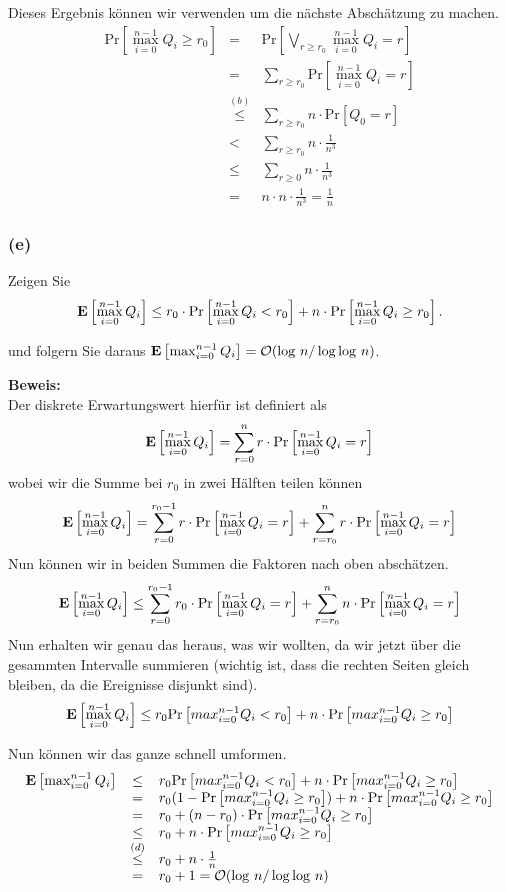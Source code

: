 \documentclass[11pt,a4paper,ngerman]{article}
\newcommand{\erw}[1]{\text{\bfseries E} \left[ #1 \right]}
\newcommand{\prob}[1]{\text{Pr}\left[ #1 \right]}
\begin{document}
Dieses Ergebnis können wir verwenden um die nächste Abschätzung zu machen.
$$\begin{array}{rcl}
	\prob{\max_{i=0}^{n-1} Q_i \geq r_0} &=& \prob{\underset{r \geq r_0}{\bigvee} \max_{i=0}^{n-1} Q_i = r}\\
		&=& \underset{r\geq r_0}{\sum} \prob{\max_{i=0}^{n-1} Q_i = r}\\
		&\stackrel{(b)}{\leq}& \underset{r\geq r_0}{\sum} n \cdot \prob{Q_0 = r}\\
		&<& \underset{r \geq r_0}{\sum} n \cdot \frac{1}{n^3}\\
		&\leq& \underset{r \geq 0}{\sum} n \cdot \frac{1}{n^3}\\
		&=& n \cdot n \cdot \frac{1}{n^3} = \frac{1}{n}
\end{array}$$

\subsubsection*{(e)}
Zeigen Sie
$$
	\erw{\max_{i=0}^{n-1} Q_i} \leq r_0 \cdot \prob{\max_{i=0}^{n-1} Q_i < r_0} + n \cdot \prob{\max_{i=0}^{n-1} Q_i \geq r_0}.
$$

und folgern Sie daraus $\erw{\max_{i=0}^{n-1}Q_i} = \mathcal{O}(\log \, n / \log \log \, n)$.

\noindent\textbf{Beweis:}\\

Der diskrete Erwartungswert hierfür ist definiert als
$$
	\erw{\max_{i=0}^{n-1} Q_i} = \sum_{r=0}^n r \cdot \prob{\max_{i=0}^{n-1} Q_i = r}
$$
wobei wir die Summe bei $r_0$ in zwei Hälften teilen können
$$
	\erw{\max_{i=0}^{n-1} Q_i} = \sum_{r=0}^{r_0-1}r \cdot \prob{\max_{i=0}^{n-1} Q_i = r} + \sum_{r= r_0}^n  r \cdot \prob{\max_{i=0}^{n-1} Q_i = r}
$$
Nun können wir in beiden Summen die Faktoren nach oben abschätzen.
$$
	\erw{\max_{i=0}^{n-1} Q_i} \leq \sum_{r=0}^{r_0-1}r_0 \cdot \prob{\max_{i=0}^{n-1} Q_i = r} + \sum_{r= r_0}^n  n \cdot \prob{\max_{i=0}^{n-1} Q_i = r}
$$
Nun erhalten wir genau das heraus, was wir wollten, da wir jetzt über die gesammten Intervalle summieren (wichtig ist,
dass die rechten Seiten gleich bleiben, da die Ereignisse disjunkt sind).
$$
	\erw{\max_{i=0}^{n-1}Q_i} \leq r_0 \prob{max_{i=0}^{n-1} Q_i < r_0} + n \cdot \prob{max_{i=0}^{n-1} Q_i \geq r_0}
$$

Nun können wir das ganze schnell umformen.
$$\begin{array}{rcl}
	\erw{\max_{i=0}^{n-1}Q_i} &\leq&  r_0 \prob{max_{i=0}^{n-1} Q_i < r_0} + n \cdot \prob{max_{i=0}^{n-1} Q_i \geq r_0}\\
		&=& r_0 (1 - \prob{max_{i=0}^{n-1} Q_i \geq r_0}) + n \cdot \prob{max_{i=0}^{n-1} Q_i \geq r_0}\\
		&=& r_0  + (n - r_0) \cdot  \prob{max_{i=0}^{n-1} Q_i \geq r_0}\\
		&\leq& r_0 + n \cdot  \prob{max_{i=0}^{n-1} Q_i \geq r_0}\\
		&\stackrel{(d)}{\leq}& r_0 + n \cdot \frac{1}{n}\\
		&=& r_0 + 1 =  \mathcal{O} (\log \, n / \log \log \, n)
\end{array}$$
\end{document}
